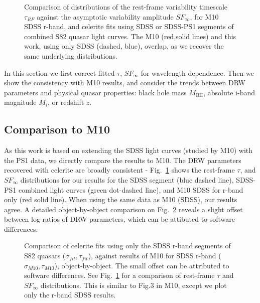 \documentclass[twocolumn]{aastex62}
\newcommand{\project}[1]{\textsf{#1}}
\begin{document}
\begin{figure} %
\caption{Comparison of distributions of the rest-frame variability timescale $\tau_{RF}$ against the  asymptotic variability amplitude $SF_{\infty}$, for M10 SDSS r-band,  and \project{celerite} fits using  SDSS or SDSS-PS1 segments of combined S82 quasar light curves. The M10 (red,solid lines) and this work, using only SDSS (dashed, blue), overlap, as we recover the same underlying distributions. }
\label{fig:tauRF_SFinf}
\end{figure} 


In this section we first correct fitted $\tau$, $SF_{\infty}$ for wavelength dependence. Then we show the consistency with M10 results,  and consider the trends between DRW parameters and physical quasar properties: black hole mass $M_{\mathrm{BH}}$, absolute i-band  magnitude $M_{i}$, or redshift $z$.  


\subsection{Comparison to M10}
As this work is based on extending the SDSS light curves (studied by M10) with the PS1 data, we directly compare the results to M10. The DRW parameters recovered with \project{celerite} are  broadly consistent - Fig.~\ref{fig:tauRF_SFinf} shows the rest-frame  $\tau$, and $SF_{\infty}$ distributions for our results for the SDSS segment (blue dashed line),  SDSS-PS1 combined light curves (green dot-dashed line), and  M10 SDSS for r-band only (red solid line). When using the same data as M10 (SDSS), our results agree. A detailed object-by-object comparison on Fig.~\ref{fig:celeriteCompare} reveals a slight offset between log-ratios of DRW parameters, which can be attibuted to software differences.


\begin{figure} %
\caption{Comparison of \project{celerite} fits using only the  SDSS r-band segments of S82 quasars ($\sigma_{fit}, \tau_{fit}$), against results of M10 for SDSS r-band ($\sigma_{M10}, \tau_{M10}$), object-by-object. The small offset can be attributed to software differences. See Fig.~\ref{fig:tauRF_SFinf} for a comparison of rest-frame $\tau$ and $SF_{\infty}$ distributions. This is similar to Fig.3 in M10, except we plot only the r-band SDSS results.}
\label{fig:celeriteCompare}
\end{figure} 
\end{document}
